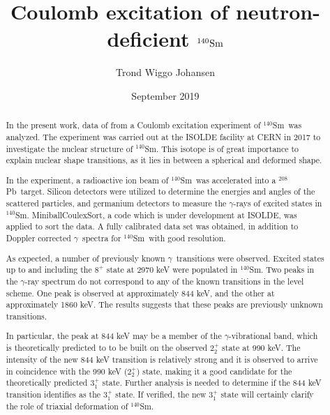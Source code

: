 \documentclass[twoside,english]{uiofysmaster/uiofysmaster}
\author{Trond Wiggo Johansen}
\title{Coulomb excitation of neutron-deficient $\textnormal{\Sm}$}
\date{September 2019}
\newcommand{\Sm}{$^{140}$Sm} %
\newcommand{\Pb}{$^{208}$Pb}
\newcommand{\ga}{$\gamma$}
\begin{document}
\setlength{\belowdisplayskip}{12pt} \setlength{\belowdisplayshortskip}{12pt}
\setlength{\abovedisplayskip}{12pt} \setlength{\abovedisplayshortskip}{12pt}

\maketitle


\begin{abstract}
In the present work, data of from a Coulomb excitation experiment of \Sm\ was analyzed. The experiment was carried out at the ISOLDE facility at CERN in 2017 to investigate the nuclear structure of \Sm. This isotope is of great importance to explain nuclear shape transitions, as it lies in between a spherical and deformed shape.

In the experiment, a radioactive ion beam of \Sm\ was accelerated into a \Pb\ target.
Silicon detectors were utilized to determine the energies and angles of the scattered particles, and germanium detectors to measure the \ga-rays of excited states in \Sm. 
MiniballCoulexSort, a code which is under development at ISOLDE, was applied to sort the data.
A fully calibrated data set was obtained, in addition to Doppler corrected \ga\ spectra for \Sm\ with good resolution. 

As expected, a number of previously known \ga\ transitions were observed.
Excited states up to and including the $8^+$ state at 2970 keV were populated in \Sm.
Two peaks in the \ga-ray spectrum do not correspond to any of the known transitions in the level scheme. One peak is observed at approximately 844 keV, and the other at approximately 1860 keV. The results suggests that these peaks are previously unknown transitions. 

In particular, the peak at 844 keV may be a member of the \ga-vibrational band, which is theoretically predicted to to be built on the observed $2_2^+$ state at 990 keV. The intensity of the new 844 keV transition is relatively strong and it is observed to arrive in coincidence with the 990 keV ($2_2^+$) state, making it a good candidate for the theoretically predicted $3_1^+$ state. Further analysis is needed to determine if the 844 keV transition identifies as the $3_1^+$ state. If verified, the new $3_1^+$ state will certainly clarify the role of triaxial deformation of \Sm. 
\end{abstract}
\end{document}
